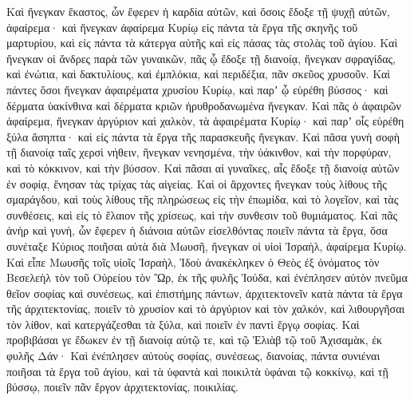 {Καὶ ἤνεγκαν ἕκαστος, ὧν ἔφερεν ἡ καρδία αὐτῶν, καὶ ὅσοις ἔδοξε τῇ ψυχῇ αὐτῶν, ἀφαίρεμα· καὶ ἤνεγκαν ἀφαίρεμα Κυρίῳ εἰς πάντα τὰ ἔργα τῆς σκηνῆς τοῦ μαρτυρίου, καὶ εἰς πάντα τὰ κάτεργα αὐτῆς καὶ εἰς πάσας τὰς στολὰς τοῦ ἁγίου.
Καὶ ἤνεγκαν οἱ ἄνδρες παρὰ τῶν γυναικῶν, πᾶς ᾧ ἔδοξε τῇ διανοίᾳ, ἤνεγκαν σφραγίδας, καὶ ἐνώτια, καὶ δακτυλίους, καὶ ἐμπλόκια, καὶ περιδέξια, πᾶν σκεῦος χρυσοῦν.
Καὶ πάντες ὅσοι ἤνεγκαν ἀφαιρέματα χρυσίου Κυρίῳ, καὶ παρʼ ᾧ εὑρέθη βύσσος· καὶ δέρματα ὑακίνθινα καὶ δέρματα κριῶν ἠρυθροδανωμένα ἤνεγκαν.
Καὶ πᾶς ὁ ἀφαιρῶν ἀφαίρεμα, ἤνεγκαν ἀργύριον καὶ χαλκὸν, τὰ ἀφαιρέματα Κυρίῳ· καὶ παρʼ οἷς εὑρέθη ξύλα ἄσηπτα· καὶ εἰς πάντα τὰ ἔργα τῆς παρασκευῆς ἤνεγκαν.
Καὶ πᾶσα γυνὴ σοφὴ τῇ διανοίᾳ ταῖς χερσὶ νήθειν, ἤνεγκαν νενησμένα, τὴν ὑάκινθον, καὶ τὴν πορφύραν, καὶ τὸ κόκκινον, καὶ τὴν βύσσον.
Καὶ πᾶσαι αἱ γυναῖκες, αἷς ἔδοξε τῇ διανοίᾳ αὐτῶν ἐν σοφίᾳ, ἔνησαν τὰς τρίχας τὰς αἰγείας.
Καὶ οἱ ἄρχοντες ἤνεγκαν τοὺς λίθους τῆς σμαράγδου, καὶ τοὺς λίθους τῆς πληρώσεως εἰς τὴν ἐπωμίδα, καὶ τὸ λογεῖον,
καὶ τὰς συνθέσεις, καὶ εἰς τὸ ἔλαιον τῆς χρίσεως, καὶ τὴν συνθεσιν τοῦ θυμιάματος.
Καὶ πᾶς ἀνὴρ καὶ γυνὴ, ὧν ἔφερεν ἡ διάνοια αὐτῶν εἰσελθόντας ποιεῖν πάντα τὰ ἔργα, ὅσα συνέταξε Κύριος ποιῆσαι αὐτὰ διὰ Μωυσῆ, ἤνεγκαν οἱ υἱοὶ Ἰσραὴλ, ἀφαίρεμα Κυρίῳ.
Καὶ εἶπε Μωυσῆς τοῖς υἱοῖς Ἰσραὴλ, Ἰδοὺ ἀνακέκληκεν ὁ Θεὸς ἐξ ὀνόματος τὸν Βεσελεὴλ τὸν τοῦ Οὐρείου τὸν Ὢρ, ἐκ τῆς φυλῆς Ἰούδα,
καὶ ἐνέπλησεν αὐτὸν πνεῦμα θεῖον σοφίας καὶ συνέσεως, καὶ ἐπιστήμης πάντων,
ἀρχιτεκτονεῖν κατὰ πάντα τὰ ἔργα τῆς ἀρχιτεκτονίας, ποιεῖν τὸ χρυσίον καὶ τὸ ἀργύριον καὶ τὸν χαλκόν,
καὶ λιθουργῆσαι τὸν λίθον, καὶ κατεργάζεσθαι τὰ ξύλα, καὶ ποιεῖν ἐν παντὶ ἔργῳ σοφίας.
Καὶ προβιβάσαι γε ἔδωκεν ἐν τῇ διανοίᾳ αὐτῷ τε, καὶ τῷ Ἐλιὰβ τῷ τοῦ Ἀχισαμὰκ, ἐκ φυλῆς Δάν·
Καὶ ἐνέπλησεν αὐτοὺς σοφίας, συνέσεως, διανοίας, πάντα συνιέναι ποιῆσαι τὰ ἔργα τοῦ ἁγίου, καὶ τὰ ὑφαντὰ καὶ ποικιλτὰ ὑφάναι τῷ κοκκίνῳ, καὶ τῇ βύσσῳ, ποιεῖν πᾶν ἔργον ἀρχιτεκτονίας, ποικιλίας.

}
